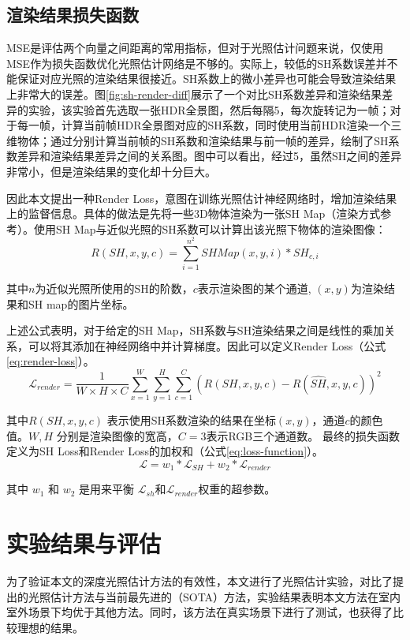 \subsection{渲染结果损失函数} MSE是评估两个向量之间距离的常用指标，但对于光照估计问题来说，仅使用MSE作为损失函数优化光照估计网络是不够的。实际上，较低的SH系数误差并不能保证对应光照的渲染结果很接近。SH系数上的微小差异也可能会导致渲染结果上非常大的误差。图\ref{fig:sh-render-diff}展示了一个对比SH系数差异和渲染结果差异的实验，该实验首先选取一张HDR全景图，然后每隔5，每次旋转记为一帧；对于每一帧，计算当前帧HDR全景图对应的SH系数，同时使用当前HDR渲染一个三维物体；通过分别计算当前帧的SH系数和渲染结果与前一帧的差异，绘制了SH系数差异和渲染结果差异之间的关系图。图中可以看出，经过5，虽然SH之间的差异非常小，但是渲染结果的变化却十分巨大。



因此本文提出一种Render Loss，意图在训练光照估计神经网络时，增加渲染结果上的监督信息。具体的做法是先将一些3D物体渲染为一张SH Map（渲染方式参考\cite{green2003spherical}）。使用SH Map与近似光照的SH系数可以计算出该光照下物体的渲染图像：
\begin{equation}
    R(SH, x, y, c) = \sum^{n^2}_{i=1}SHMap(x,y,i)*SH_{c,i}
\end{equation}

其中$n$为近似光照所使用的SH的阶数，$c$表示渲染图的某个通道, $(x, y)$为渲染结果和SH map的图片坐标。

上述公式表明，对于给定的SH Map，SH系数与SH渲染结果之间是线性的乘加关系，可以将其添加在神经网络中并计算梯度。因此可以定义Render Loss（公式\ref{eq:render-loss}）。
\begin{equation}
    \label{eq:render-loss}
    \mathcal{L}_{render} = \frac{1}{W\times H\times C} \sum_{x=1}^{W}\sum_{y=1}^{H}\sum_{c=1}^{C}(R(SH,x,y,c)-R(\hat{SH},x,y,c))^{2}
\end{equation}

其中$R(SH,x,y,c)$ 表示使用SH系数渲染的结果在坐标$(x,y)$，通道$c$的颜色值。$W, H$ 分别是渲染图像的宽高，$C=3$表示RGB三个通道数。
最终的损失函数定义为SH Loss和Render Loss的加权和（公式\ref{eq:loss-function}）。
\begin{equation}
    \label{eq:loss-function}
    \mathcal{L} =w_{1}*\mathcal{L}_{SH}+w_{2}*\mathcal{L}_{render}
\end{equation}

 其中 $w_1$ 和 $w_2$ 是用来平衡 $\mathcal{L}_{sh}$和$\mathcal{L}_{render}$权重的超参数。
\section{实验结果与评估}\label{sec:experiment}
为了验证本文的深度光照估计方法的有效性，本文进行了光照估计实验，对比了提出的光照估计方法与当前最先进的（SOTA）方法，实验结果表明本文方法在室内室外场景下均优于其他方法。同时，该方法在真实场景下进行了测试，也获得了比较理想的结果。

